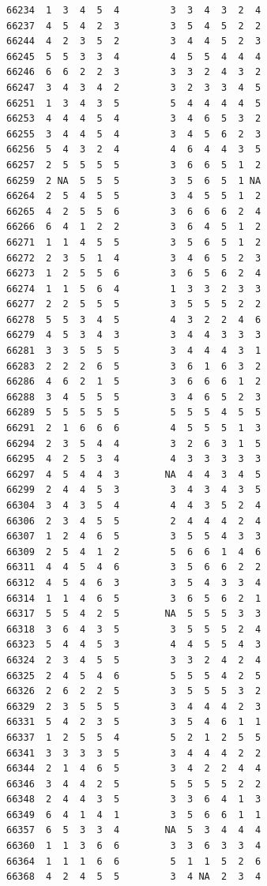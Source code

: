\documentclass[
  letterpaper,
  DIV=11,
  numbers=noendperiod]{scrreprt}
\begin{document}
\begin{verbatim}
66234  1  3  4  5  4         3  3  4  3  2  4
66237  4  5  4  2  3         3  5  4  5  2  2
66244  4  2  3  5  2         3  4  4  5  2  3
66245  5  5  3  3  4         4  5  5  4  4  4
66246  6  6  2  2  3         3  3  2  4  3  2
66247  3  4  3  4  2         3  2  3  3  4  5
66251  1  3  4  3  5         5  4  4  4  4  5
66253  4  4  4  5  4         3  4  6  5  3  2
66255  3  4  4  5  4         3  4  5  6  2  3
66256  5  4  3  2  4         4  6  4  4  3  5
66257  2  5  5  5  5         3  6  6  5  1  2
66259  2 NA  5  5  5         3  5  6  5  1 NA
66264  2  5  4  5  5         3  4  5  5  1  2
66265  4  2  5  5  6         3  6  6  6  2  4
66266  6  4  1  2  2         3  6  4  5  1  2
66271  1  1  4  5  5         3  5  6  5  1  2
66272  2  3  5  1  4         3  4  6  5  2  3
66273  1  2  5  5  6         3  6  5  6  2  4
66274  1  1  5  6  4         1  3  3  2  3  3
66277  2  2  5  5  5         3  5  5  5  2  2
66278  5  5  3  4  5         4  3  2  2  4  6
66279  4  5  3  4  3         3  4  4  3  3  3
66281  3  3  5  5  5         3  4  4  4  3  1
66283  2  2  2  6  5         3  6  1  6  3  2
66286  4  6  2  1  5         3  6  6  6  1  2
66288  3  4  5  5  5         3  4  6  5  2  3
66289  5  5  5  5  5         5  5  5  4  5  5
66291  2  1  6  6  6         4  5  5  5  1  3
66294  2  3  5  4  4         3  2  6  3  1  5
66295  4  2  5  3  4         4  3  3  3  3  3
66297  4  5  4  4  3        NA  4  4  3  4  5
66299  2  4  4  5  3         3  4  3  4  3  5
66304  3  4  3  5  4         4  4  3  5  2  4
66306  2  3  4  5  5         2  4  4  4  2  4
66307  1  2  4  6  5         3  5  5  4  3  3
66309  2  5  4  1  2         5  6  6  1  4  6
66311  4  4  5  4  6         3  5  6  6  2  2
66312  4  5  4  6  3         3  5  4  3  3  4
66314  1  1  4  6  5         3  6  5  6  2  1
66317  5  5  4  2  5        NA  5  5  5  3  3
66318  3  6  4  3  5         3  5  5  5  2  4
66323  5  4  4  5  3         4  4  5  5  4  3
66324  2  3  4  5  5         3  3  2  4  2  4
66325  2  4  5  4  6         5  5  5  4  2  5
66326  2  6  2  2  5         3  5  5  5  3  2
66329  2  3  5  5  5         3  4  4  4  2  3
66331  5  4  2  3  5         3  5  4  6  1  1
66337  1  2  5  5  4         5  2  1  2  5  5
66341  3  3  3  3  5         3  4  4  4  2  2
66344  2  1  4  6  5         3  4  2  2  4  4
66346  3  4  4  2  5         5  5  5  5  2  2
66348  2  4  4  3  5         3  3  6  4  1  3
66349  6  4  1  4  1         3  5  6  6  1  1
66357  6  5  3  3  4        NA  5  3  4  4  4
66360  1  1  3  6  6         3  3  6  3  3  4
66364  1  1  1  6  6         5  1  1  5  2  6
66368  4  2  4  5  5         3  4 NA  2  3  4

\end{verbatim}
\end{document}
